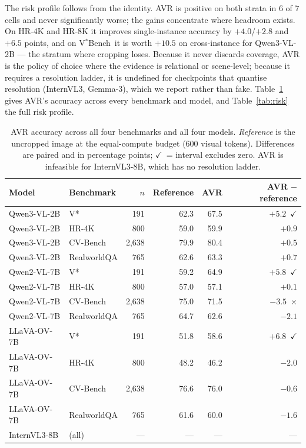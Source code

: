 \documentclass{article} %
\newcommand{\bad}[1]{\textcolor{bad}{#1}}
\newcommand{\gd}[1]{\textcolor{gd}{#1}}
\newcommand{\ok}{\gd{$\checkmark$}}
\newcommand{\no}{\bad{$\times$}}
\newcommand{\vstar}{V$^*$Bench}
\begin{document}
The risk profile follows from the identity. AVR is positive on both strata in $6$ of $7$ cells and never significantly worse; the gains concentrate where headroom exists. On HR-4K and HR-8K it improves single-instance accuracy by $+4.0$/$+2.8$ and $+6.5$ points, and on \vstar\ it is worth $+10.5$ on cross-instance for Qwen3-VL-2B --- the stratum where cropping loses. Because it never discards coverage, AVR is the policy of choice where the evidence is relational or scene-level; because it requires a resolution ladder, it is undefined for checkpoints that quantise resolution (InternVL3, Gemma-3), which we report rather than fake. Table~\ref{tab:avr_all} gives AVR's accuracy across every benchmark and model, and Table~\ref{tab:risk} the full risk profile.


\begin{table}[t]
\centering\small
\setlength{\tabcolsep}{4pt}
\caption{AVR accuracy across all four benchmarks and all four models. \emph{Reference} is the uncropped image at the equal-compute budget ($600$ visual tokens). Differences are paired and in percentage points; \ok\ = interval excludes zero. AVR is infeasible for InternVL3-8B, which has no resolution ladder.}
\label{tab:avr_all}
\begin{tabular}{llrrrr}
\toprule
Model & Benchmark & $n$ & Reference & AVR & AVR $-$ reference \\
\midrule
Qwen3-VL-2B & V* & 191 & 62.3 & 67.5 & \gd{$+5.2$}~\ok \\
Qwen3-VL-2B & HR-4K & 800 & 59.0 & 59.9 & $+0.9$ \\
Qwen3-VL-2B & CV-Bench & 2{,}638 & 79.9 & 80.4 & $+0.5$ \\
Qwen3-VL-2B & RealworldQA & 765 & 62.6 & 63.3 & $+0.7$ \\
\midrule
Qwen2-VL-7B & V* & 191 & 59.2 & 64.9 & \gd{$+5.8$}~\ok \\
Qwen2-VL-7B & HR-4K & 800 & 57.0 & 57.1 & $+0.1$ \\
Qwen2-VL-7B & CV-Bench & 2{,}638 & 75.0 & 71.5 & \bad{$-3.5$}~\no \\
Qwen2-VL-7B & RealworldQA & 765 & 64.7 & 62.6 & $-2.1$ \\
\midrule
LLaVA-OV-7B & V* & 191 & 51.8 & 58.6 & \gd{$+6.8$}~\ok \\
LLaVA-OV-7B & HR-4K & 800 & 48.2 & 46.2 & $-2.0$ \\
LLaVA-OV-7B & CV-Bench & 2{,}638 & 76.6 & 76.0 & $-0.6$ \\
LLaVA-OV-7B & RealworldQA & 765 & 61.6 & 60.0 & $-1.6$ \\
\midrule
InternVL3-8B & (all) & --- & --- & --- & --- \\
\bottomrule
\end{tabular}
\end{table}
\end{document}
